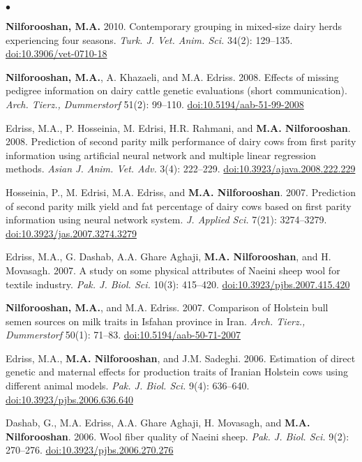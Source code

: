 \documentclass[margin,line]{res}
\newenvironment{list2}{
  \begin{list}{$\bullet$}{%
      \setlength{\itemsep}{0in}
      \setlength{\parsep}{0in} \setlength{\parskip}{0in}
      \setlength{\topsep}{0in} \setlength{\partopsep}{0in}
      \setlength{\leftmargin}{0.2in}}}{\end{list}}
\begin{document}
\begin{resume}
\begin{list2}
\item {\bf Nilforooshan, M.A.} 2010. Contemporary grouping in mixed-size dairy herds experiencing four seasons. {\em Turk. J. Vet. Anim. Sci.} 34(2): 129--135. \href{https://doi.org/10.3906/vet-0710-18}{doi:10.3906/vet-0710-18}
\item {\bf Nilforooshan, M.A.}, A. Khazaeli, and M.A. Edriss. 2008. Effects of missing pedigree information on dairy cattle genetic evaluations (short communication). {\em Arch. Tierz., Dummerstorf} 51(2): 99--110. \href{https://doi.org/10.5194/aab-51-99-2008}{doi:10.5194/aab-51-99-2008}
\item Edriss, M.A., P. Hosseinia, M. Edrisi, H.R. Rahmani, and {\bf M.A. Nilforooshan}. 2008. Prediction of second parity milk performance of dairy cows from first parity information using artificial neural network and multiple linear regression methods. {\em Asian J. Anim. Vet. Adv.} 3(4): 222--229. \href{https://doi.org/10.3923/ajava.2008.222.229}{doi:10.3923/ajava.2008.222.229}
\item Hosseinia, P., M. Edrisi, M.A. Edriss, and {\bf M.A. Nilforooshan}. 2007. Prediction of second parity milk yield and fat percentage of dairy cows based on first parity information using neural network system. {\em J. Applied Sci.} 7(21): 3274--3279. \href{https://doi.org/10.3923/jas.2007.3274.3279}{doi:10.3923/jas.2007.3274.3279}
\item Edriss, M.A., G. Dashab, A.A. Ghare Aghaji, {\bf M.A. Nilforooshan}, and H. Movasagh. 2007. A study on some physical attributes of Naeini sheep wool for textile industry. {\em Pak. J. Biol. Sci.} 10(3): 415--420. \href{https://doi.org/10.3923/pjbs.2007.415.420}{doi:10.3923/pjbs.2007.415.420}
\item {\bf Nilforooshan, M.A.}, and M.A. Edriss. 2007. Comparison of Holstein bull semen sources on milk traits in Isfahan province in Iran. {\em Arch. Tierz., Dummerstorf} 50(1): 71--83. \href{https://doi.org/10.5194/aab-50-71-2007}{doi:10.5194/aab-50-71-2007}
\item Edriss, M.A., {\bf M.A. Nilforooshan}, and J.M. Sadeghi. 2006. Estimation of direct genetic and maternal effects for production traits of Iranian Holstein cows using different animal models. {\em Pak. J. Biol. Sci.} 9(4): 636--640. \href{https://doi.org/10.3923/pjbs.2006.636.640}{doi:10.3923/pjbs.2006.636.640}
\item Dashab, G., M.A. Edriss, A.A. Ghare Aghaji, H. Movasagh, and {\bf M.A. Nilforooshan}. 2006. Wool fiber quality of Naeini sheep. {\em Pak. J. Biol. Sci.} 9(2): 270--276. \href{https://doi.org/10.3923/pjbs.2006.270.276}{doi:10.3923/pjbs.2006.270.276}

\end{list2}
\end{resume}
\end{document}
